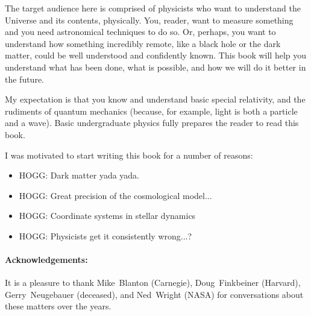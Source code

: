 \documentclass{book}
\begin{document}
The target audience here is comprised of physicists who want to understand the Universe and its contents, physically.
You, reader, want to measure something and you need astronomical techniques to do so.
Or, perhaps, you want to understand how something incredibly remote, like a black hole or the dark matter, could be well understood and confidently known.
This book will help you understand what has been done, what is possible, and how we will do it better in the future.

My expectation is that you know and understand basic special relativity, and the rudiments of quantum mechanics (because, for example, light is both a particle and a wave).
Basic undergraduate physics fully prepares the reader to read this book.

I was motivated to start writing this book for a number of reasons:
\begin{itemize}
    \item HOGG: Dark matter yada yada.
    \item HOGG: Great precision of the cosmological model...
    \item HOGG: Coordinate systems in stellar dynamics
    \item HOGG: Physicists get it consistently wrong...?
\end{itemize}

\paragraph{Acknowledgements:}
It is a pleasure to thank
  Mike~Blanton (Carnegie),
  Doug~Finkbeiner (Harvard),
  Gerry~Neugebauer (deceased), and
  Ned~Wright (NASA)
for conversations about these matters over the years.

\tableofcontents
\mainmatter
\end{document}
